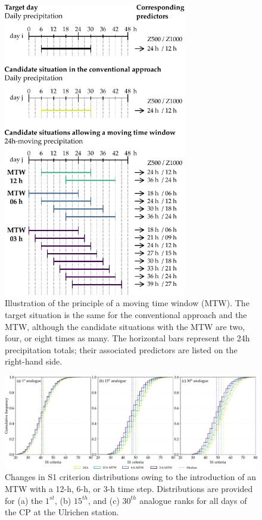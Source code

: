 \documentclass[hess, manuscript]{copernicus}
\begin{document}
	\begin{figure}[htb]
		\begin{center}
			\includegraphics[width=8cm]{fig02.pdf}
		\end{center}
		\caption{Illustration of the principle of a moving time window (MTW). The target situation is the same for the conventional approach and the MTW, although the candidate situations with the MTW are two, four, or eight times as many. The horizontal bars represent the 24h precipitation totals; their associated predictors are listed on the right-hand side.}
		\label{fig:principle}
	\end{figure}
	
	\begin{figure}[htb]
		\begin{center}
			\includegraphics[width=17cm]{fig03.pdf}
		\end{center}
		\caption{Changes in S1 criterion distributions owing to the introduction of an MTW with a 12-h, 6-h, or 3-h time step. Distributions are provided for (a) the $1^{st}$, (b) $15^{th}$, and (c) $30^{th}$ analogue ranks for all days of the CP at the Ulrichen station.}
		\label{fig:changes_S1_analogs}
	\end{figure}
	
\end{document}

